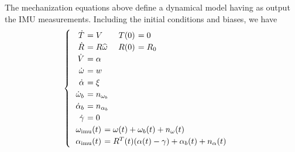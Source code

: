 \documentclass[]{article}
\def\w{\omega}
\def\imu{_\mathrm{imu}}
\begin{document}
The mechanization equations above define a dynamical model having as output the IMU measurements. Including the initial conditions and biases, we have
\begin{equation}
\begin{cases}
\begin{tabular}{>{$}r<{$} >{$\!\!\!\!\!}l<{$} >{$}r<{$} >{$\!\!\!\!\!}l<{$}}
\dot T &= V & T(0) &= 0 \\
\dot R &= R \widehat \w & R(0) &= R_0\\
\dot V &= \alpha \\ %
\dot \w &= w\\ %
\dot \alpha &= \xi \\%
\dot \w_b &= n_{\w_b}  \\
\dot \alpha_b &= n_{\alpha_b}  \\ 
\dot \gamma &= 0 \\
\end{tabular}\\
\begin{tabular}{>{$}r<{$} >{$\!\!\!\!\!}l<{$}}
\w\imu (t) &= \w(t) + \w_b(t) + n_{\w}(t) \\ 
\alpha\imu (t) &= R^T(t) (\alpha(t)- \gamma) + \alpha_b(t) + n_{\alpha}(t) 
\end{tabular}
\end{cases}
\end{equation}
\end{document}
